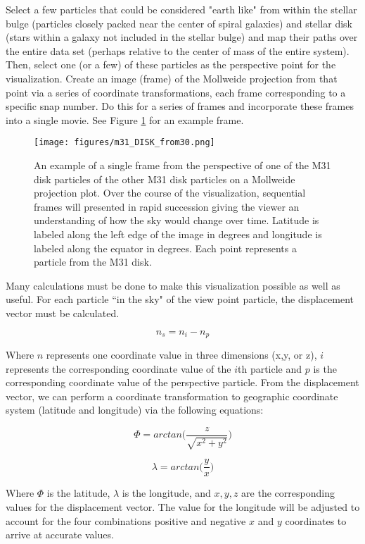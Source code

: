 \documentclass[twocolumn]{aastex63}
\begin{document}
Select a few particles that could be considered "earth like" from within the stellar bulge (particles closely packed near the center of spiral galaxies) and stellar disk (stars within a galaxy not included in the stellar bulge) and map their paths over the entire data set (perhaps relative to the center of mass of the entire system). Then, select one (or a few) of these particles as the perspective point for the visualization. Create an image (frame) of the Mollweide projection from that point via a series of coordinate transformations, each frame corresponding to a specific snap number. Do this for a series of frames and incorporate these frames into a single movie. See Figure \ref{fig:exIM} for an example frame.
\begin{figure}
    \centering
    \texttt{[image: figures/m31\_DISK\_from30.png]}
    \caption{An example of a single frame from the perspective of one of the M31 disk particles of the other M31 disk particles on a Mollweide projection plot. Over the course of the visualization, sequential frames will presented in rapid succession giving the viewer an understanding of how the sky would change over time.  Latitude is labeled along the left edge of the image in degrees and longitude is labeled along the equator in degrees. Each point represents a particle from the M31 disk.}
    \label{fig:exIM}
\end{figure}

Many calculations must be done to make this visualization possible as well as useful. For each particle ``in the sky" of the view point particle, the displacement vector must be calculated.

$$n_{s} = n_{i}-n_{p}$$


Where $n$ represents one coordinate value in three dimensions (x,y, or z), $i$ represents the corresponding coordinate value of the $i$th particle and $p$ is the corresponding coordinate value of the perspective particle. From the displacement vector, we can perform a coordinate transformation to geographic coordinate system (latitude and longitude) via the following equations:

$$\Phi = arctan \Bigg( \frac{z}{\sqrt{x^2+y^2}} \Bigg) $$

$$\lambda = arctan \Big(\frac{y}{x}\Bigg) $$

Where $\Phi$ is the latitude, $\lambda$ is the longitude, and $x,y,z$ are the corresponding values for the displacement vector. The value for the longitude will be adjusted to account for the four combinations positive and negative $x$ and $y$ coordinates to arrive at accurate values.
\end{document}
